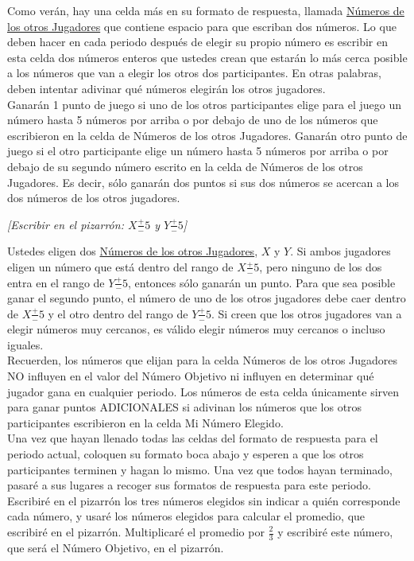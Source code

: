 Como verán, hay una celda más en su formato de respuesta, llamada \underline{Números de los otros Jugadores} que contiene espacio para que escriban dos números. Lo que deben hacer en cada periodo después de elegir su propio número es escribir en esta celda dos números enteros que ustedes crean que estarán lo más cerca posible a los números que van a elegir los otros dos participantes. En otras palabras, deben intentar adivinar qué números elegirán los otros jugadores.\\

Ganarán 1 punto de juego si uno de los otros participantes elige para el juego un número hasta 5 números por arriba o por debajo de uno de los números que escribieron en la celda de Números de los otros Jugadores. Ganarán otro punto de juego si el otro participante elige un número hasta 5 números por arriba o por debajo de su segundo número escrito en la celda de Números de los otros Jugadores.
Es decir, sólo ganarán dos puntos si sus dos números se acercan a los dos números de los otros jugadores.\\

\begin{center}
\textit{[Escribir en el pizarrón: $X \frac{+}{-}5$ y $Y \frac{+}{-}5$]}\\
\end{center}

Ustedes eligen dos \underline{Números de los otros Jugadores}, $X$ y $Y$. Si ambos jugadores eligen un número que está dentro del rango de $X \frac{+}{-}5$, pero ninguno de los dos entra en el rango de $Y \frac{+}{-}5$, entonces sólo ganarán un punto. Para que sea posible ganar el segundo punto, el número de uno de los otros jugadores debe caer dentro de $X \frac{+}{-}5$ y el otro dentro del rango de $Y\frac{+}{-}5$. Si creen que los otros jugadores van a elegir números muy cercanos, es válido elegir números muy cercanos o incluso iguales.\\

Recuerden, los números que elijan para la celda Números de los otros Jugadores NO influyen en el valor del Número Objetivo ni influyen en determinar qué jugador gana en cualquier periodo. Los números de esta celda únicamente sirven para ganar puntos ADICIONALES si adivinan los números que los otros participantes escribieron en la celda Mi Número Elegido.\\

Una vez que hayan llenado todas las celdas del formato de respuesta para el periodo actual, coloquen su formato boca abajo y esperen a que los otros participantes terminen y hagan lo mismo. Una vez que todos hayan terminado, pasaré a sus lugares a recoger sus formatos de respuesta para este periodo. Escribiré en el pizarrón los tres números elegidos sin indicar a quién corresponde cada número, y usaré los números elegidos para calcular el promedio, que escribiré en el pizarrón. Multiplicaré el promedio por $\frac{2}{3}$  y escribiré este número, que será el Número Objetivo, en el pizarrón.\\

